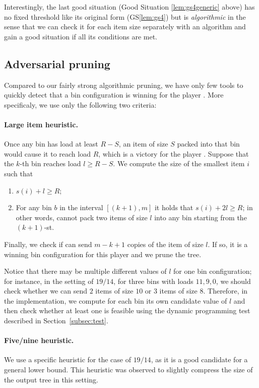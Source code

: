 Interestingly, the last good situation (Good Situation
\ref{lem:gs4generic} above) has no fixed threshold like its original
form (GS\ref{lem:gs4}) but is \emph{algorithmic} in the sense that we
can check it for each item size separately with an algorithm and gain
a good situation if all its conditions are met.

\subsection{Adversarial pruning}\label{sec:4:advpruning}

Compared to our fairly strong algorithmic pruning, we have only few
tools to quickly detect that a bin configuration is winning for the
player \adversary. More specificaly, we use only the following two
criteria:

\paragraph{Large item heuristic.} Once any bin has load at least $R-S$,
an item of size $S$ packed into that bin would cause it to reach load
$R$, which is a victory for the player \adversary. Suppose that the
$k$-th bin reaches load $l \ge R-S$. We compute the size of the
smallest item $i$ such that

\begin{enumerate}
\item $s(i) + l \ge R$;
\item For any bin $b$ in the interval $[(k+1), m]$ it holds
that $s(i) + 2l \ge R$; in other words, \algo cannot pack
two items of size $l$ into any bin starting from the $(k+1)$-st.
\end{enumerate}

Finally, we check if \adversary can send $m-k+1$ copies of the item of
size $l$. If so, it is a winning bin configuration for this player and
we prune the tree.

Notice that there may be multiple different values of $l$ for one bin
configuration; for instance, in the setting of $19/14$, for three bins
with loads $11,9,0$, we should check whether we can send $2$ items of
size $10$ or $3$ items of size $8$. Therefore, in the implementation,
we compute for each bin its own candidate value of $l$ and then check
whether at least one is feasible using the dynamic programming test
described in Section~\ref{subsec:test}.

\paragraph{Five/nine heuristic.} We use a specific heuristic for the
case of $19/14$, as it is a good candidate for a general lower
bound. This heuristic was observed to slightly compress the size of
the output tree in this setting.

